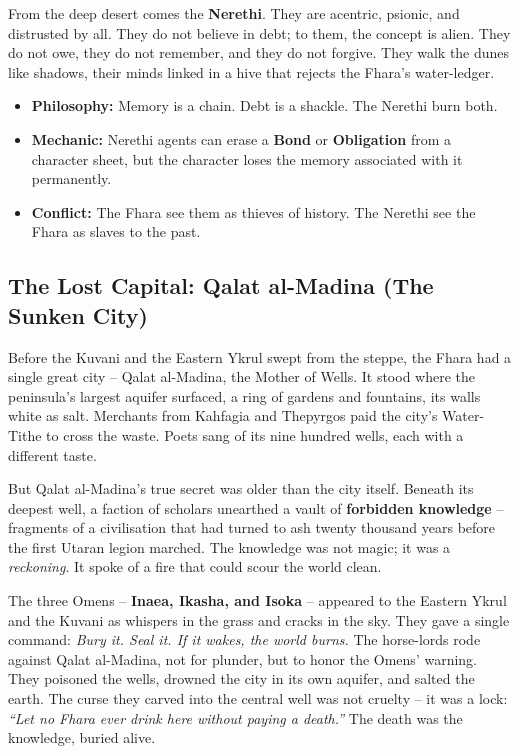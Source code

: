 From the deep desert comes the \textbf{Nerethi}. They are acentric, psionic, and distrusted by all. They do not believe in debt; to them, the concept is alien. They do not owe, they do not remember, and they do not forgive. They walk the dunes like shadows, their minds linked in a hive that rejects the Fhara's water-ledger.

\begin{itemize}
  \item \textbf{Philosophy:} Memory is a chain. Debt is a shackle. The Nerethi burn both.
  \item \textbf{Mechanic:} Nerethi agents can erase a \textbf{Bond} or \textbf{Obligation} from a character sheet, but the character loses the memory associated with it permanently.
  \item \textbf{Conflict:} The Fhara see them as thieves of history. The Nerethi see the Fhara as slaves to the past.
\end{itemize}

\subsection*{The Lost Capital: Qalat al-Madina (The Sunken City)}
\label{subsec:qalat}

Before the Kuvani and the Eastern Ykrul swept from the steppe, the Fhara had a single great city -- Qalat al-Madina, the Mother of Wells. It stood where the peninsula's largest aquifer surfaced, a ring of gardens and fountains, its walls white as salt. Merchants from Kahfagia and Thepyrgos paid the city's Water-Tithe to cross the waste. Poets sang of its nine hundred wells, each with a different taste.

But Qalat al-Madina's true secret was older than the city itself. Beneath its deepest well, a faction of scholars unearthed a vault of \textbf{forbidden knowledge} -- fragments of a civilisation that had turned to ash twenty thousand years before the first Utaran legion marched. The knowledge was not magic; it was a \textit{reckoning}. It spoke of a fire that could scour the world clean.

The three Omens -- \textbf{Inaea, Ikasha, and Isoka} -- appeared to the Eastern Ykrul and the Kuvani as whispers in the grass and cracks in the sky. They gave a single command: \textit{Bury it. Seal it. If it wakes, the world burns.} The horse-lords rode against Qalat al-Madina, not for plunder, but to honor the Omens' warning. They poisoned the wells, drowned the city in its own aquifer, and salted the earth. The curse they carved into the central well was not cruelty -- it was a lock: \textit{``Let no Fhara ever drink here without paying a death.''} The death was the knowledge, buried alive.

